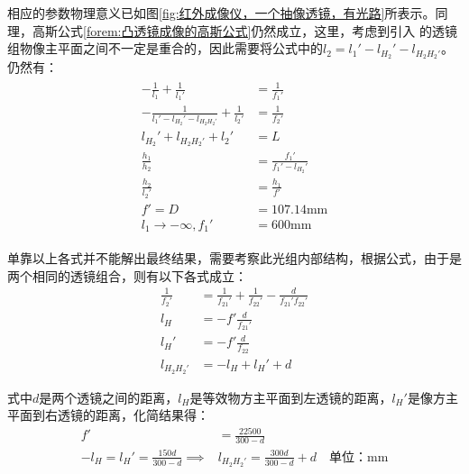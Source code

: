 \documentclass[11pt]{article}
\begin{document}
\par
相应的参数物理意义已如图\ref{fig:红外成像仪，一个抽像透镜，有光路}所表示。同理，高斯公式\ref{forem:凸透镜成像的高斯公式}仍然成立，这里，考虑到引入 的透镜组物像主平面之间不一定是重合的，因此需要将公式中的$l_2=l_1'-l_{H_2}'-l_{H_2H_2'}$。仍然有：
\begin{align}
  \begin{aligned}
    -\frac{1}{l_1}+                       \frac{1}{l_1'}  & =\frac{1}{f_1'}             \\
    -\frac{1}{l_1'-l_{H_2}'-l_{H_2H_2'}}  +\frac{1}{l_2'} & =\frac{1}{f_2'}             \\
    l_{H_2}'+l_{H_2H_2'}                 +l_2'            & =L                          \\
    \frac{h_1}{h_2}                                       & =\frac{f_1'}{f_1'-l_{H_2}'} \\
    \frac{h_2}{l_2'}                                      & =\frac{h_1}{f'}             \\
    f'=D                                                  & =107.14\unit{\mm}           \\
    l_1\rightarrow-\infty,f_1'                            & =600\unit{\mm}
  \end{aligned}
  \label{forem:等效透镜组}
\end{align}
\par
单靠以上各式并不能解出最终结果，需要考察此光组内部结构，根据公式\cite*{optical_engineer}，由于是两个相同的透镜组合，则有以下各式成立：
\begin{align}
  \frac{1}{f_2'} & =\frac{1}{f_{21}'}+\frac{1}{f_{22}'}-\frac{d}{f_{21}'f_{22}'} \\
  l_H            & =-f'\frac{d}{f_{21}'}                                         \\
  l_H'           & =-f'\frac{d}{f_{22}}                                          \\
  l_{H_2H_2'}    & =-l_H+l_H'+d
\end{align}
\par
式中$d$是两个透镜之间的距离，$l_H$是等效物方主平面到左透镜的距离，$l_H'$是像方主平面到右透镜的距离，化简结果得：
\begin{align*}
  f'                                   & =\frac{22500}{300-d}                                      \\
  -l_H=l_H'=\frac{150d}{300-d}\implies & l_{H_2H_2'}=\frac{300d}{300-d}+d\quad\text{单位：}\unit{\mm}
\end{align*}
\par
\end{document}

